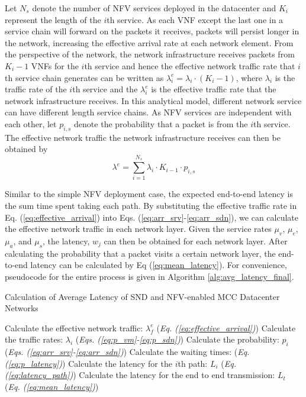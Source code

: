 Let $N_s$ denote the number of NFV services deployed in the datacenter and $K_i$ represent the length of the $i$th service. As each VNF except the last one in a service chain will forward on the packets it receives, packets will persist longer in the network, increasing the effective arrival rate at each network element. From the perspective of the network, the network infrastructure receives packets from $K_i-1$ VNFs for the $i$th service and hence the effective network traffic rate that $i$th service chain generates can be written as $\lambda_{i}^{e} = \lambda_{i} \cdot (K_i - 1)$, where $\lambda_{i}$ is the traffic rate of the $i$th service and the $\lambda_{i}^e$ is the effective traffic rate that the network infrastructure receives. In this analytical model, different network service can have different length  service chains. As NFV services are independent with each other, let $p_{i,s}$ denote the probability that a packet is from the $i$th service. The effective network traffic the network infrastructure receives can then be obtained by
\begin{equation}
    \label{eq:effective_arrival}
    \lambda^e =\sum_{i=1}^{N_s} \lambda_{i} \cdot K_{i-1} \cdot p_{i,s}
\end{equation}

Similar to the simple NFV deployment case, the expected end-to-end latency is the sum time spent taking each path. By substituting the effective traffic rate in Eq. (\ref{eq:effective_arrival}) into Eqs. (\ref{eq:arr_srv}-\ref{eq:arr_sdn}), we can calculate the effective network traffic in each network layer. Given the service rates $\mu_v$, $\mu_e$, $\mu_a$, and $\mu_s$, the latency, $w_j$ can then be obtained for each network layer. After calculating the probability that a packet visits a certain network layer, the end-to-end latency can be calculated by Eq (\ref{eq:mean_latency}). For convenience, pseudocode for the entire process is given in Algorithm \ref{alg:avg_latency_final}.

\begin{algorithm}

    \caption{Calculation of Average Latency of SND and NFV-enabled MCC Datacenter Networks}
    \label{alg:avg_latency_final}

    \begin{algorithmic}[1]
        \STATE Calculate the effective network traffic: $\lambda_f^e$ \hfill(\textit{Eq. (\ref{eq:effective_arrival})})
        \STATE Calculate the traffic rates: $\lambda_i$ \hfill(\textit{Eqs. (\ref{eq:p_vm}-\ref{eq:p_sdn})})
        \STATE Calculate the probability: $p_i$ \hfill(\textit{Eqs. (\ref{eq:arr_srv}-\ref{eq:arr_sdn})})
        \STATE Calculate the waiting times: \hfill(\textit{Eq. (\ref{eq:p_latency})})
        \STATE Calculate the latency for the $i$th path: $L_i$ \hfill (\textit{Eq. (\ref{eq:latency_path})})
        \STATE Calculate the latency for the end to end transmission: $L_t$ \hfill (\textit{Eq. (\ref{eq:mean_latency})})
    \end{algorithmic}
\end{algorithm}
